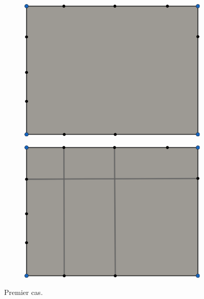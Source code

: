 \begin{figure}[h!]
\centering
\begin{subfigure}{0.49\textwidth}
    \includegraphics[width=\textwidth]{images/limit_cycle_1.pdf}
\end{subfigure}
\hfill
\begin{subfigure}{0.49\textwidth}
    \includegraphics[width=\textwidth]{images/limit_cycle_2.pdf}
\end{subfigure}
\caption{Premier cas.}
\label{fig:cycle_1}
\end{figure}


